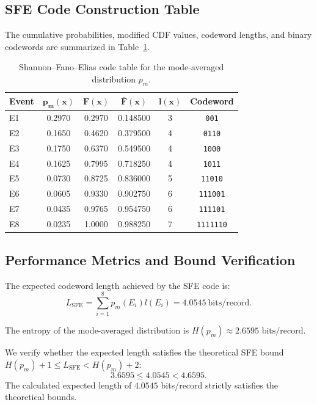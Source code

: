 \documentclass[11pt,a4paper]{article}
\begin{document}
\subsection{SFE Code Construction Table}

The cumulative probabilities, modified CDF values, codeword lengths, and binary codewords are summarized in Table~\ref{tab:sfe_code}.

\begin{table}[H]
    \centering
    \caption{Shannon--Fano--Elias code table for the mode-averaged distribution $p_m$.}
    \label{tab:sfe_code}
    \begin{tabular}{lccccc}
        \toprule
        \textbf{Event} & $\boldsymbol{p_m(x)}$ & $\boldsymbol{F(x)}$ & $\boldsymbol{\bar{F}(x)}$ & $\boldsymbol{l(x)}$ & \textbf{Codeword} \\
        \midrule
        E1 & 0.2970 & 0.2970 & 0.148500 & 3 & \texttt{001} \\
        E2 & 0.1650 & 0.4620 & 0.379500 & 4 & \texttt{0110} \\
        E3 & 0.1750 & 0.6370 & 0.549500 & 4 & \texttt{1000} \\
        E4 & 0.1625 & 0.7995 & 0.718250 & 4 & \texttt{1011} \\
        E5 & 0.0730 & 0.8725 & 0.836000 & 5 & \texttt{11010} \\
        E6 & 0.0605 & 0.9330 & 0.902750 & 6 & \texttt{111001} \\
        E7 & 0.0435 & 0.9765 & 0.954750 & 6 & \texttt{111101} \\
        E8 & 0.0235 & 1.0000 & 0.988250 & 7 & \texttt{1111110} \\
        \bottomrule
    \end{tabular}
\end{table}

\subsection{Performance Metrics and Bound Verification}

The expected codeword length achieved by the SFE code is:
\begin{equation}
    L_{\mathrm{SFE}} = \sum_{i=1}^{8} p_m(E_i) l(E_i) = \boxed{4.0545\ \text{bits/record}}.
\end{equation}

The entropy of the mode-averaged distribution is $H(p_m) \approx 2.6595\text{ bits/record}$. 

We verify whether the expected length satisfies the theoretical SFE bound $H(p_m) + 1 \le L_{\mathrm{SFE}} < H(p_m) + 2$:
\begin{equation}
    3.6595 \le 4.0545 < 4.6595.
\end{equation}
The calculated expected length of $4.0545$ bits/record strictly satisfies the theoretical bounds.
\end{document}
